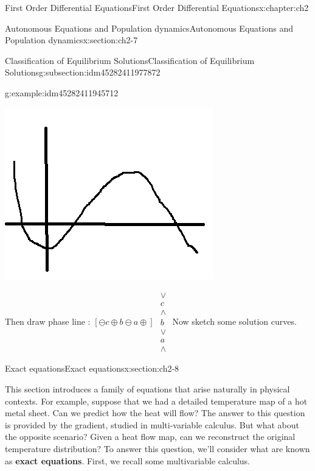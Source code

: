 \documentclass[oneside,10pt,]{book}
\newcommand{\terminology}[1]{\textbf{#1}}
\numberwithin{equation}{section}
\numberwithin{equation}{section}
\begin{document}
\begin{chapterptx}{First Order Differential Equations}{}{First Order Differential Equations}{}{}{x:chapter:ch2}
\begin{sectionptx}{Autonomous Equations and Population dynamics}{}{Autonomous Equations and Population dynamics}{}{}{x:section:ch2-7}
\begin{subsectionptx}{Classification of Equilibrium Solutions}{}{Classification of Equilibrium Solutions}{}{}{g:subsection:idm45282411977872}
\begin{example}{}{g:example:idm45282411945712}
\begin{image}{0}{1}{0}
\includegraphics[width=\linewidth]{images/1.6-f(y).png}
\end{image}%
 Then draw phase line : \(\left[\ominus c\oplus b\ominus a\oplus\right]\) \(\begin{array}{c}
\vee\\
c\\
\wedge\\
b\\
\vee\\
a\\
\wedge
\end{array}\) Now sketch some solution curves.%
%
\end{example}
\end{subsectionptx}
\end{sectionptx}
%
%
\typeout{************************************************}
\typeout{************************************************}
%
\begin{sectionptx}{Exact equations}{}{Exact equations}{}{}{x:section:ch2-8}
\begin{introduction}{}%
This section introduces a family of equations that arise naturally in physical contexts. For example, suppose that we had a detailed temperature map of a hot metal sheet. Can we predict how the heat will flow? The answer to this question is provided by the gradient, studied in multi-variable calculus. But what about the opposite scenario? Given a heat flow map, can we reconstruct the original temperature distribution? To answer this question, we'll consider what are known as \terminology{exact equations}. First, we recall some multivariable calculus.%

\end{introduction}
\end{sectionptx}
\end{chapterptx}
\end{document}
